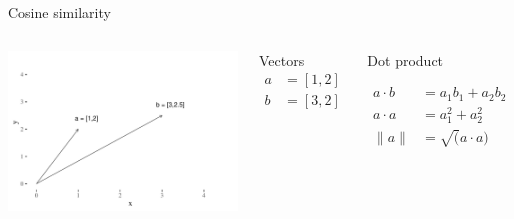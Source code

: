 \documentclass[
  10pt,
  ignorenonframetext,
  x11names, dvipsnames, bibspacing,natbib, table]{beamer}
\begin{document}
\begin{frame}{Cosine similarity}
\protect\hypertarget{cosine-similarity}{}
\begin{columns}
    

\begin{center}\includegraphics[width=1\linewidth]{presentationBoston_files/figure-beamer/cosine1-1} \end{center}



\footnotesize 

\begin{block}{Vectors}
\begin{align*}
a  & = [1,2]\\
b  &= [3,2]
\end{align*}

\end{block}
\pause 

\begin{block}{Dot product}


\begin{align*}
a \cdot b & = a_1 b_1 + a_2 b_2\\
a \cdot a & = a_1^2 + a_2 ^ 2 \\
\lVert a\rVert & = \sqrt(a \cdot a)
\end{align*}

\end{block}



\end{columns}
\end{frame}
\end{document}
